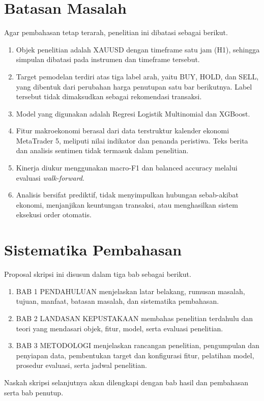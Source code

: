 \section{Batasan Masalah}
Agar pembahasan tetap terarah, penelitian ini dibatasi sebagai berikut.
\begin{enumerate}
    \item Objek penelitian adalah XAUUSD dengan timeframe satu jam (H1), sehingga simpulan dibatasi pada instrumen dan timeframe tersebut.
    \item Target pemodelan terdiri atas tiga label arah, yaitu BUY, HOLD, dan SELL, yang dibentuk dari perubahan harga penutupan satu bar berikutnya. Label tersebut tidak dimaksudkan sebagai rekomendasi transaksi.
    \item Model yang digunakan adalah Regresi Logistik Multinomial dan XGBoost.
    \item Fitur makroekonomi berasal dari data terstruktur kalender ekonomi MetaTrader 5, meliputi nilai indikator dan penanda peristiwa. Teks berita dan analisis sentimen tidak termasuk dalam penelitian.
    \item Kinerja diukur menggunakan macro-F1 dan balanced accuracy melalui evaluasi \emph{walk-forward}.
    \item Analisis bersifat prediktif, tidak menyimpulkan hubungan sebab-akibat ekonomi, menjanjikan keuntungan transaksi, atau menghasilkan sistem eksekusi order otomatis.
\end{enumerate}

\section{Sistematika Pembahasan}
Proposal skripsi ini disusun dalam tiga bab sebagai berikut.
\begin{enumerate}
    \item BAB 1 PENDAHULUAN menjelaskan latar belakang, rumusan masalah, tujuan, manfaat, batasan masalah, dan sistematika pembahasan.
    \item BAB 2 LANDASAN KEPUSTAKAAN membahas penelitian terdahulu dan teori yang mendasari objek, fitur, model, serta evaluasi penelitian.
    \item BAB 3 METODOLOGI menjelaskan rancangan penelitian, pengumpulan dan penyiapan data, pembentukan target dan konfigurasi fitur, pelatihan model, prosedur evaluasi, serta jadwal penelitian.
\end{enumerate}
Naskah skripsi selanjutnya akan dilengkapi dengan bab hasil dan pembahasan serta bab penutup.
